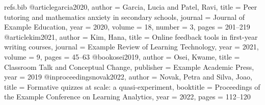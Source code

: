 \begin{filecontents*}[overwrite]{refs.bib}
@article{garcia2020,
  author  = {Garcia, Lucia and Patel, Ravi},
  title   = {Peer tutoring and mathematics anxiety in secondary schools},
  journal = {Journal of Example Education},
  year    = {2020},
  volume  = {18},
  number  = {3},
  pages   = {201--219}
}
@article{kim2021,
  author  = {Kim, Hana},
  title   = {Online feedback tools in first-year writing courses},
  journal = {Example Review of Learning Technology},
  year    = {2021},
  volume  = {9},
  pages   = {45--63}
}
@book{osei2019,
  author    = {Osei, Kwame},
  title     = {Classroom Talk and Conceptual Change},
  publisher = {Example Academic Press},
  year      = {2019}
}
@inproceedings{novak2022,
  author    = {Novak, Petra and Silva, Joao},
  title     = {Formative quizzes at scale: a quasi-experiment},
  booktitle = {Proceedings of the Example Conference on Learning Analytics},
  year      = {2022},
  pages     = {112--120}
}
\end{filecontents*}
\documentclass[10pt,a4paper]{article}
\usepackage[a4paper,landscape,margin=1.6cm]{geometry}
\usepackage{longtable}
\usepackage{booktabs}
\usepackage{array}
\usepackage{xcolor}
\usepackage{colortbl}
\usepackage[authoryear,round]{natbib}
\usepackage{microtype}
\usepackage[hidelinks]{hyperref}

\setlength{\parindent}{0pt}

\newcolumntype{P}[1]{>{\raggedright\arraybackslash}p{#1}}
\newcommand{\head}[1]{\textcolor{white}{\bfseries #1}}



{\Large\bfseries Literature Review Matrix\par}
\smallskip
Topic: feedback and peer learning in classrooms \quad|\quad Compiled by Your Name \quad|\quad Last updated 13 September 2026

\medskip
Use one row per source. Fill every column even when the answer is ``not reported'', so gaps become visible.

